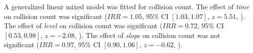 A generalized linear mixed model was fitted for collision count.
The effect of \textit{time} on collision count was significant ($IRR = 1.05$, 95\% CI $[1.03, 1.07]$, $z = 5.51$, ).
The effect of \textit{level} on collision count was significant ($IRR = 0.72$, 95\% CI $[0.53, 0.98]$, $z = -2.08$, ).
The effect of \textit{slope} on collision count was not significant ($IRR = 0.97$, 95\% CI $[0.90, 1.06]$, $z = -0.62$, ).
